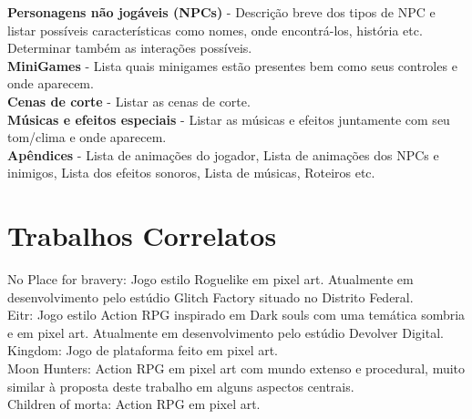 \documentclass[12pt, 
openright, 
oneside, 
a4paper,    
brazil]{facom-ufu-abntex2}
\begin{document}
\textbf{Personagens não jogáveis (NPCs)} - Descrição breve dos tipos de NPC e listar possíveis características como nomes, onde encontrá-los, história etc. Determinar também as interações possíveis.\\
\textbf{MiniGames} - Lista quais minigames estão presentes bem como seus controles e onde aparecem.\\
\textbf{Cenas de corte} - Listar as cenas de corte.\\
\textbf{Músicas e efeitos especiais} - Listar as músicas e efeitos juntamente com seu tom/clima e onde aparecem.\\
\textbf{Apêndices} - Lista de animações do jogador, Lista de animações dos NPCs e inimigos, Lista dos efeitos sonoros, Lista de músicas, Roteiros etc.

\chapter{Trabalhos Correlatos}
\label{sec:trabcorr}

No Place for bravery: Jogo estilo Roguelike em pixel art. Atualmente em desenvolvimento pelo estúdio Glitch Factory situado no Distrito Federal.\\

Eitr: Jogo estilo Action RPG inspirado em Dark souls com uma temática sombria e em pixel art. Atualmente em desenvolvimento pelo estúdio Devolver Digital.\\

Kingdom: Jogo de plataforma feito em pixel art. \\

Moon Hunters: Action RPG em pixel art com mundo extenso e procedural, muito similar à proposta deste trabalho em alguns aspectos centrais. \\

Children of morta: Action RPG em pixel art. \\

\end{document}
